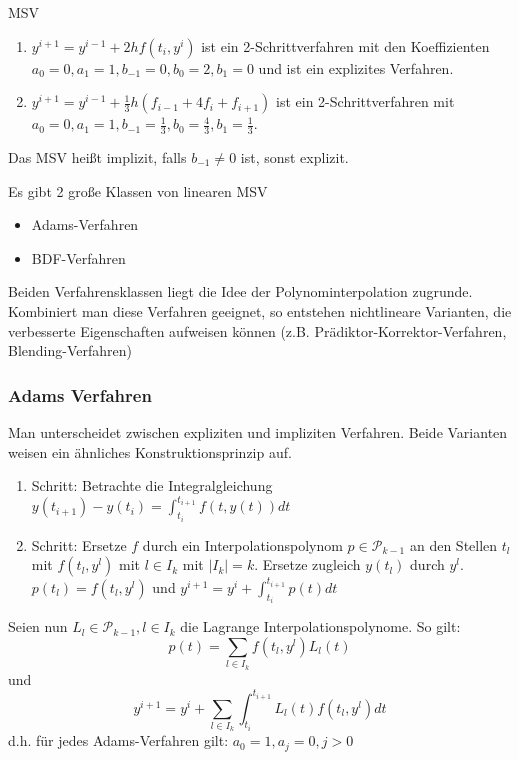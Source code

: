 \begin{example} MSV
	\begin{enumerate}
		\item $y^{i+1}=y^{i-1}+2hf(t_{i},y^{i})$ ist ein 2-Schrittverfahren mit den Koeffizienten $a_{0}=0,a_{1}=1,b_{-1}=0,b_{0}=2,b_{1}=0$
		und ist ein explizites Verfahren.
		\item $y^{i+1}=y^{i-1}+\frac{1}{3}h(f_{i-1}+4f_{i}+f_{i+1})$ ist ein 2-Schrittverfahren mit $a_{0}=0,a_{1}=1,b_{-1}=\frac{1}{3},b_{0}=\frac{4}{3},b_{1}=\frac{1}{3}$.
	\end{enumerate}
\end{example}

\begin{remark}
	Das MSV heißt implizit, falls $b_{-1}\not = 0$ ist, sonst explizit.
\end{remark}

Es gibt 2 große Klassen von linearen MSV
\begin{itemize}
	\item Adams-Verfahren
	\item BDF-Verfahren
\end{itemize}

Beiden Verfahrensklassen liegt die Idee der Polynominterpolation zugrunde. Kombiniert man diese Verfahren geeignet, so entstehen
nichtlineare Varianten, die verbesserte Eigenschaften aufweisen können (z.B. Prädiktor-Korrektor-Verfahren, Blending-Verfahren)

\subsubsection{Adams Verfahren}
Man unterscheidet zwischen expliziten und impliziten Verfahren. Beide Varianten weisen ein ähnliches Konstruktionsprinzip auf.
\begin{enumerate}
	\item Schritt: Betrachte die Integralgleichung $y(t_{i+1})-y(t_{i})=\int_{t_{i}}^{t_{i+1}}f(t,y(t))dt$
	\item Schritt: Ersetze $f$ durch ein Interpolationspolynom $p \in \mathcal{P}_{k-1}$ an den Stellen $t_{l}$ mit $f(t_{l},y^{l})$ mit $l\in I_{k}$
	mit $|I_{k}|=k$. Ersetze zugleich $y(t_{l})$ durch $y^{l}$. $p(t_{l})=f(t_{l},y^{l})$ und $y^{i+1}=y^{i}+\int_{t_{i}}^{t_{i+1}}p(t)dt$
\end{enumerate}

Seien nun $L_{l}\in \mathcal{P}_{k-1},l\in I_{k}$ die Lagrange Interpolationspolynome. So gilt: $$p(t)=\sum_{l\in I_{k}}f(t_{l},y^{l})L_{l}(t)$$
und $$y^{i+1}=y^{i}+\sum_{l\in I_{k}}\int_{t_{i}}^{t_{i+1}}L_{l}(t)f(t_{l},y^{l})dt$$
d.h. für jedes Adams-Verfahren gilt: $a_{0}=1, a_{j}=0,j>0$

